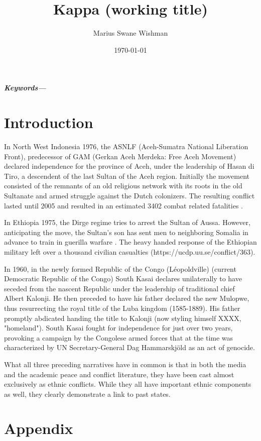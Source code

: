 \documentclass[12pt]{article}
\title{Kappa (working title)}
\author[1]{Marius Swane Wishman}
\affil[1]{Department of Sociology and Political Science, NTNU}
\date{\today}
\providecommand{\keywords}[1]
{
	\small	
	\textbf{\textit{Keywords---}} #1
}
\begin{document}
\maketitle



\begin{abstract}
\end{abstract}

\keywords{}

\pagebreak


\onehalfspacing


\section{Introduction}

In North West Indonesia 1976, the ASNLF (Aceh-Sumatra National Liberation
Front), predecessor of GAM (Gerkan Aceh Merdeka: Free Aceh Movement) declared
independence for the province of Aceh, under the leadership of Hasan di Tiro,
a descendent of the last Sultan of the Aceh region. Initially the movement
consisted of the remnants of an old religious network with its roots in the
old Sultanate and armed struggle against the Dutch colonizers. The resulting
conflict lasted until 2005 and resulted in an estimated 3402 combat related
fatalities \citep{Aspinall2009, Pettersson2018, Sundberg2013}.

In Ethiopia 1975, the Dirge regime tries to arrest the Sultan of Aussa. However,
anticipating the move, the Sultan's son has sent men to neighboring Somalia in
advance to train in guerilla warfare \citep{Shehim1985}. The heavy handed
response of the Ethiopian military left over a thousand civilian casualties
(https://ucdp.uu.se/conflict/363).

In 1960, in the newly formed Republic of the Congo (Léopoldville) (current Democratic
Republic of the Congo) South Kasai declares unilaterally to have seceded from
the nascent Republic under the leadership of traditional chief Albert Kalonji.
He then preceded to have his father declared the new Mulopwe, thus resurrecting
the royal title of the Luba kingdom (1585-1889). His father promptly abdicated
handing the title to Kalonji (now styling himself XXXX, "homeland"). South Kasai
fought for independence for just over two years, provoking a campaign by the
Congolese armed forces that at the time was characterized by UN
Secretary-General Dag Hammarskjöld as an act of genocide.

What all three preceding narratives have in common is that in both the media
and the academic peace and conflict literature, they have been cast almost
exclusively as ethnic conflicts. While they all have important ethnic components
as well, they clearly demonstrate a link to past states.

\pagebreak




\section{Appendix}
\end{document}
